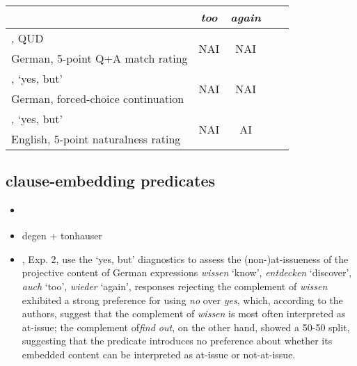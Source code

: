 \documentclass[times,linguex,xcolor]{glossa}
\begin{document}
    \begin{tabular}{l c c c c}\toprule
            & \emph{too} 
              & \emph{again}
                        \\\midrule
        
        \citealt{chen_presuppositions_2024}, QUD
            & \multirow{2}{*}{NAI}
              & \multirow{2}{*}{NAI}
                        \\ 
        \scriptsize German, 5-point Q+A match rating  &  \\ \midrule

        \citealt{xue_correlation_2011}, `yes, but'
            & \multirow{2}{*}{NAI}
              & \multirow{2}{*}{NAI}
                        \\ 
        \scriptsize German, forced-choice continuation  &  \\ \midrule

        \citealt{cummins_backgrounding_2013}, `yes, but'
            & \multirow{2}{*}{NAI}
              & \multirow{2}{*}{AI}
                        \\ 
        \scriptsize English, 5-point naturalness rating   &  \\ \midrule

    \end{tabular}

  \subsection{clause-embedding predicates}
    \begin{itemize}
      \item \citealt{tonhauser_how_2018}
      \item degen + tonhauser

      \item \citealt{xue_correlation_2011}, Exp. 2, use the `yes, but' diagnostics to assess the (non-)at-issueness of the projective content of German expressions \emph{wissen} `know',  \emph{entdecken} `discover',  \emph{auch} `too',  \emph{wieder} `again',  responses rejecting the complement of \emph{wissen} exhibited a strong preference for using \emph{no} over \emph{yes}, which, according to the authors, suggest that the complement of \emph{wissen} is most often interpreted as at-issue; the complement of\emph{find out}, on the other hand, showed a 50-50 split, suggesting that the predicate introduces no preference about whether its embedded content can be interpreted as at-issue or not-at-issue.

    \end{itemize}
\end{document}
